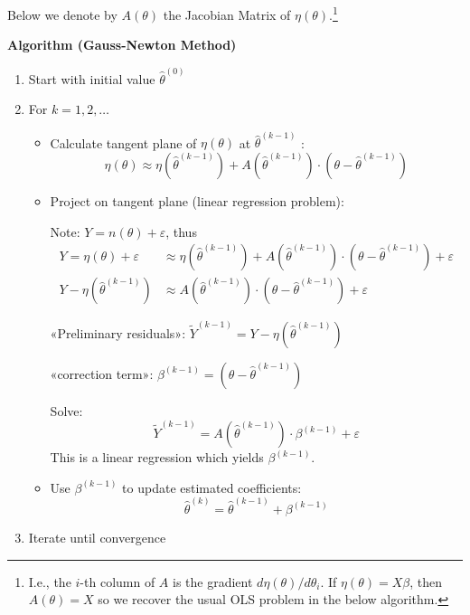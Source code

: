 \documentclass[11pt, %
	oneside, %
	english, %
	onehalfspacing, %
	]{article} %
\numberwithin{equation}{section}
\begin{document}
Below we denote by $A(\theta)$ the Jacobian Matrix of $\eta(\theta)$.\footnote{I.e., the $i$-th column of $A$ is the gradient $d \eta(\theta) / d \theta_i$. If $\eta(\theta) = X \beta$, then $A(\theta) = X$ so we recover the usual OLS problem in the below algorithm.}

\noindent\textbf{Algorithm (Gauss-Newton Method)}

\begin{enumerate}
    \item Start with initial value $\hat{\theta}^{(0)}$

    \item For $k=1,2, \ldots$

    \begin{itemize}
        \item Calculate tangent plane of $\eta(\theta)$ at $\hat{\theta}^{(k-1)}$ :
        $$
        \eta(\theta) \approx \eta\left(\hat{\theta}^{(k-1)}\right)+A\left(\hat{\theta}^{(k-1)}\right) \cdot\left(\theta-\hat{\theta}^{(k-1)}\right)
        $$
        \item Project on tangent plane (linear regression problem):

        Note: $Y = n(\theta) + \varepsilon$, thus
        $$
        \begin{aligned}
        Y = \eta(\theta) + \varepsilon &\approx \eta\left(\hat{\theta}^{(k-1)}\right)+A\left(\hat{\theta}^{(k-1)}\right) \cdot\left(\theta-\hat{\theta}^{(k-1)}\right) + \varepsilon \\
        Y - \eta(\hat{\theta}^{(k-1)}) &\approx A\left(\hat{\theta}^{(k-1)}\right) \cdot\left(\theta-\hat{\theta}^{(k-1)}\right) + \varepsilon
        \end{aligned}
        $$

        «Preliminary residuals»: $\tilde{Y}^{(k-1)}=Y-\eta\left(\hat{\theta}^{(k-1)}\right)$

        «correction term»: $\beta^{(k-1)}=\left(\theta-\hat{\theta}^{(k-1)}\right)$

        Solve:
        $$
        \tilde{Y}^{(k-1)}=A\left(\hat{\theta}^{(k-1)}\right) \cdot \beta^{(k-1)}+\varepsilon
        $$
        This is a linear regression which yields $\beta^{(k-1)}$.

        \item Use $\beta^{(k-1)}$ to update estimated coefficients:
        $$
        \hat{\theta}^{(k)}=\hat{\theta}^{(k-1)}+\beta^{(k-1)}
        $$
    \end{itemize}

    \item Iterate until convergence
\end{enumerate}
\end{document}
